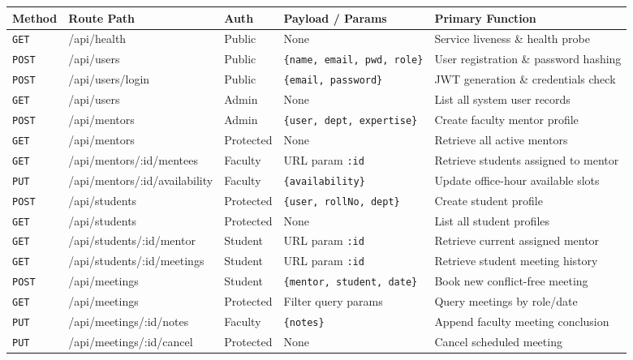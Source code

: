 \documentclass[11pt,a4paper]{article}
\begin{document}
\begin{table}[H]
\centering
\scriptsize
\begin{tabularx}{\textwidth}{@{}p{1.0cm}>{\ttfamily\raggedright}p{4.6cm}p{1.3cm}>{\raggedright}p{2.8cm}X@{}}
\toprule
\textbf{Method} & \textbf{Route Path} & \textbf{Auth} & \textbf{Payload / Params} & \textbf{Primary Function} \\
\midrule
\texttt{GET} & /api/health & Public & None & Service liveness \& health probe \\
\texttt{POST} & /api/users & Public & \texttt{\{name, email, pwd, role\}} & User registration \& password hashing \\
\texttt{POST} & /api/users/login & Public & \texttt{\{email, password\}} & JWT generation \& credentials check \\
\texttt{GET} & /api/users & Admin & None & List all system user records \\
\midrule
\texttt{POST} & /api/mentors & Admin & \texttt{\{user, dept, expertise\}} & Create faculty mentor profile \\
\texttt{GET} & /api/mentors & Protected & None & Retrieve all active mentors \\
\texttt{GET} & /api/mentors/:id/mentees & Faculty & URL param \texttt{:id} & Retrieve students assigned to mentor \\
\texttt{PUT} & /api/mentors/:id/availability & Faculty & \texttt{\{availability\}} & Update office-hour available slots \\
\midrule
\texttt{POST} & /api/students & Protected & \texttt{\{user, rollNo, dept\}} & Create student profile \\
\texttt{GET} & /api/students & Protected & None & List all student profiles \\
\texttt{GET} & /api/students/:id/mentor & Student & URL param \texttt{:id} & Retrieve current assigned mentor \\
\texttt{GET} & /api/students/:id/meetings & Student & URL param \texttt{:id} & Retrieve student meeting history \\
\midrule
\texttt{POST} & /api/meetings & Student & \texttt{\{mentor, student, date\}} & Book new conflict-free meeting \\
\texttt{GET} & /api/meetings & Protected & Filter query params & Query meetings by role/date \\
\texttt{PUT} & /api/meetings/:id/notes & Faculty & \texttt{\{notes\}} & Append faculty meeting conclusion \\
\texttt{PUT} & /api/meetings/:id/cancel & Protected & None & Cancel scheduled meeting \\

\end{tabularx}
\end{table}
\end{document}
